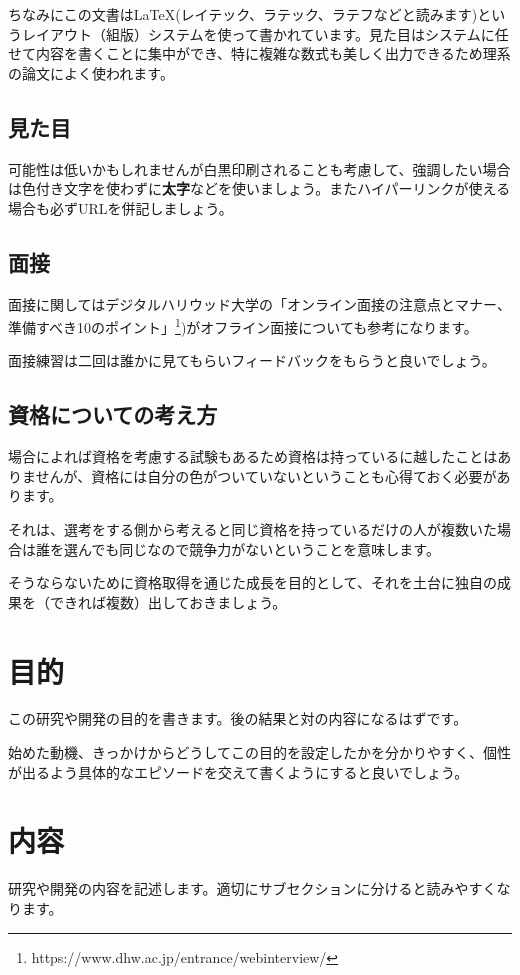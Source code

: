 \documentclass[dvipdfmx, a4paper]{jsarticle}
\begin{document}
ちなみにこの文書は\LaTeX(レイテック、ラテック、ラテフなどと読みます)というレイアウト（組版）システムを使って書かれています。見た目はシステムに任せて内容を書くことに集中ができ、特に複雑な数式も美しく出力できるため理系の論文によく使われます。

\subsection{見た目}
可能性は低いかもしれませんが白黒印刷されることも考慮して、強調したい場合は色付き文字を使わずに\textbf{太字}などを使いましょう。またハイパーリンクが使える場合も必ずURLを併記しましょう。

\subsection{面接}
面接に関してはデジタルハリウッド大学の「オンライン面接の注意点とマナー、準備すべき10のポイント」\footnote{https://www.dhw.ac.jp/entrance/webinterview/})がオフライン面接についても参考になります。

面接練習は二回は誰かに見てもらいフィードバックをもらうと良いでしょう。

\subsection{資格についての考え方}
場合によれば資格を考慮する試験もあるため資格は持っているに越したことはありませんが、資格には自分の色がついていないということも心得ておく必要があります。

それは、選考をする側から考えると同じ資格を持っているだけの人が複数いた場合は誰を選んでも同じなので競争力がないということを意味します。

そうならないために資格取得を通じた成長を目的として、それを土台に独自の成果を（できれば複数）出しておきましょう。

\section{目的}
この研究や開発の目的を書きます。後の結果と対の内容になるはずです。

始めた動機、きっかけからどうしてこの目的を設定したかを分かりやすく、個性が出るよう具体的なエピソードを交えて書くようにすると良いでしょう。

\section{内容}
研究や開発の内容を記述します。適切にサブセクションに分けると読みやすくなります。
\end{document}
